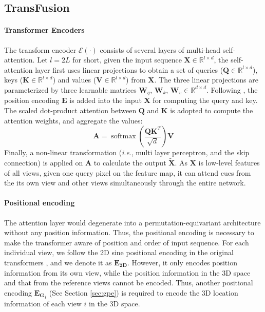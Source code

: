 \documentclass{bmvc2k}
\newcommand{\ie}{\textit{i}.\textit{e}., }
\begin{document}
\vspace{-1.0em}
\subsection{TransFusion}
\vspace{-0.5em}
\paragraph{Transformer Encoders}
The transform encoder $\mathcal{E(\cdot)}$ consists of several layers of multi-head self-attention. 
Let $l = 2L$ for short, given the input sequence $\mathbf{X} \in \mathbb{R}^{l \times d}$, the self-attention layer first uses linear projections to obtain a set of queries ($\mathbf{Q} \in \mathbb{R}^{l \times d} $), keys ($\mathbf{K} \in \mathbb{R}^{l \times d} $) and values ($ \mathbf{V} \in \mathbb{R}^{l \times d}$) from $\mathbf{X}$. The three linear projections are parameterized by three learnable matrices $\mathbf{W}_q$,  $\mathbf{W}_k$, $\mathbf{W}_v \in \mathbb{R}^{d\times d}$.
Following \cite{carion2020end}, the position encoding $\mathbf{E}$ is added into the input $\mathbf{X}$ for computing the query and key. 
The scaled dot-product attention \cite{vaswani2017attention} between $\mathbf{Q}$ and $\mathbf{K}$ is adopted to compute the attention weights, and aggregate the values: 
\begin{equation}
    \mathbf{A}=\operatorname{softmax}\left(\frac{\mathbf{Q K}^{T}}{\sqrt{d}}\right) \mathbf{V}
\end{equation}
Finally, a non-linear transformation (\ie multi layer perceptron, and the skip connection) is applied on $\mathbf{A}$ to calculate the output $\tilde{\mathbf{X}}$. 
As $\mathbf{X}$ is low-level features of all views, given one query pixel on the feature map, it can attend cues from the its own view and other views simultaneously through the entire network. 

\vspace{-0.8em}
\paragraph{Positional encoding}
The attention layer would degenerate into a permutation-equivariant architecture without any position information. Thus, the positional encoding is necessary to make the transformer aware of position and order of input sequence.  
For each individual view, we follow the 2D sine positional encoding in the original transformers \cite{dosovitskiy2020image, yang2020transpose}, and we denote it as $\mathbf{E_{2D}}$. However, it only encodes position information from its own view, while the position information in the 3D space and that from the reference views cannot be encoded. Thus, another positional encoding $\mathbf{E_{G}}_i$ (See Section \ref{sec:gpe}) is required to encode the 3D location information of each view $i$ in the 3D space. 
\end{document}
